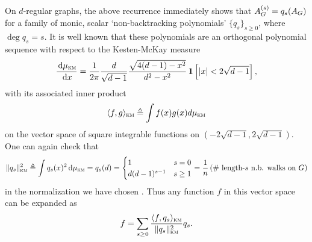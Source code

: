 On $d$-regular graphs, the above recurrence immediately shows that $A^{(s)}_{G} = q_s(A_{G})$ for a family of monic, scalar `non-backtracking polynomials' $\{q_s\}_{s\ge 0}$, where $\deg q_s = s$. It is well known that these polynomials are an orthogonal polynomial sequence with respect to the Kesten-McKay measure
\[
	\frac{\,\textup{d}\mu_{\textsc{km}}}{\,\textup{d} x} = \frac{1}{2\pi} \frac{d}{\sqrt{d-1}} \frac{\sqrt{4(d-1) - x^2}}{d^2 - x^2}\,\boldsymbol{1} \left[ {|x|< 2\sqrt{d-1}} \right],
\]
with its associated inner product 
$$
    \langle f,g \rangle_{\textsc{km}} \triangleq \int f(x)g(x) d\mu_{\textsc{km}}
$$
on the vector space of square integrable functions on $(-2\sqrt{d-1},2\sqrt{d-1})$. One can again check that
\[
	\|q_s\|_{\textsc{km}}^2 \triangleq \int q_s(x)^2\,\textup{d}\mu_{\textsc{km}} = q_s(d) =  \begin{cases} 1 & s = 0 \\ d(d-1)^{s-1} & s \ge 1 \end{cases} = \frac{1}{n}\left(\text{\# length-$s$ n.b. walks on $G$}\right)
\]
in the normalization we have chosen \cite{alon2007non}. Thus any function $f$ in this vector space can be expanded as
$$
    f = \sum_{s \ge 0} \frac{\langle f, q_s \rangle_{\textsc{km}}}{\|q_s\|^2_{\textsc{km}}} q_s.
$$
